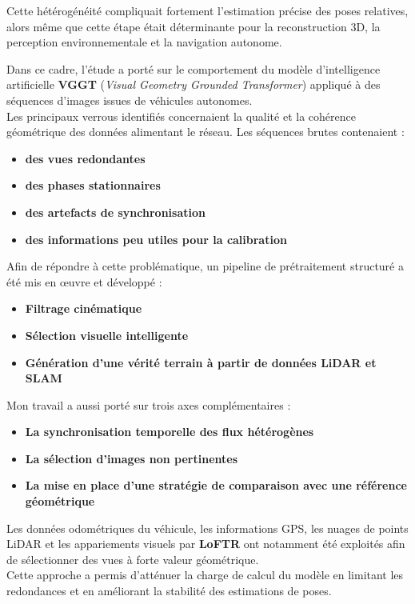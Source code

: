 \documentclass[12pt,a4paper,oneside]{report}
\begin{document}
Cette hétérogénéité compliquait fortement l'estimation précise des poses relatives, alors même que cette étape était déterminante pour la reconstruction 3D, la perception environnementale et la navigation autonome.

\bigskip

Dans ce cadre, l'étude a porté sur le comportement du modèle d'intelligence artificielle \textbf{VGGT} (\textit{Visual Geometry Grounded Transformer}) appliqué à des séquences d'images issues de véhicules autonomes. \\
\hspace*{.3cm}Les principaux verrous identifiés concernaient la qualité et la cohérence géométrique des données alimentant le réseau. Les séquences brutes contenaient :
\begin{itemize}[label=\textbullet]
    \item \textbf{des vues redondantes}
    \item \textbf{des phases stationnaires}
    \item \textbf{des artefacts de synchronisation}
    \item \textbf{des informations peu utiles pour la calibration}
\end{itemize}

\bigskip

Afin de répondre à cette problématique, un pipeline de prétraitement structuré a été mis en œuvre et développé : 
\begin{itemize}[label=\textbullet]
    \item \textbf{Filtrage cinématique}
    \item \textbf{Sélection visuelle intelligente}
    \item \textbf{Génération d'une vérité terrain à partir de données LiDAR et SLAM}
\end{itemize}

\bigskip

Mon travail a aussi porté sur trois axes complémentaires :
    \begin{itemize}[label=\textbullet]
    \item \textbf{La synchronisation temporelle des flux hétérogènes}
    \item \textbf{La sélection d'images non pertinentes}
    \item \textbf{La mise en place d'une stratégie de comparaison avec une référence géométrique}
\end{itemize}

\hspace*{1cm} Les données odométriques du véhicule, les informations GPS, les nuages de points LiDAR et les appariements visuels par \textbf{LoFTR} ont notamment été exploités afin de sélectionner des vues à forte valeur géométrique.\\
Cette approche a permis d'atténuer la charge de calcul du modèle en limitant les redondances et en améliorant la stabilité des estimations de poses.
\end{document}
